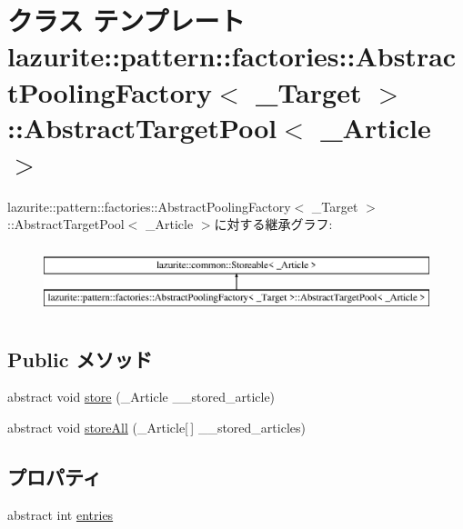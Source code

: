 \hypertarget{classlazurite_1_1pattern_1_1factories_1_1_abstract_pooling_factory_3_01___target_01_4_1_1_abstra513b29652c04fa77de240c337e958a8d}{
\section{クラス テンプレート lazurite::pattern::factories::AbstractPoolingFactory$<$ \_\-Target $>$::AbstractTargetPool$<$ \_\-Article $>$}
\label{classlazurite_1_1pattern_1_1factories_1_1_abstract_pooling_factory_3_01___target_01_4_1_1_abstra513b29652c04fa77de240c337e958a8d}
}
lazurite::pattern::factories::AbstractPoolingFactory$<$ \_\-Target $>$::AbstractTargetPool$<$ \_\-Article $>$に対する継承グラフ:\begin{figure}[H]
\begin{center}
\leavevmode
\includegraphics[height=2cm]{classlazurite_1_1pattern_1_1factories_1_1_abstract_pooling_factory_3_01___target_01_4_1_1_abstra513b29652c04fa77de240c337e958a8d}
\end{center}
\end{figure}
\subsection*{Public メソッド}
\begin{DoxyCompactItemize}
\item 
abstract void \hyperlink{classlazurite_1_1pattern_1_1factories_1_1_abstract_pooling_factory_3_01___target_01_4_1_1_abstra513b29652c04fa77de240c337e958a8d_a2d11e4ff0f0cdb377a20750454d562b7}{store} (\_\-Article \_\-\_\-stored\_\-article)
\item 
abstract void \hyperlink{classlazurite_1_1pattern_1_1factories_1_1_abstract_pooling_factory_3_01___target_01_4_1_1_abstra513b29652c04fa77de240c337e958a8d_a7b249c9e345439ad7e583aa71225e5fd}{storeAll} (\_\-Article\mbox{[}$\,$\mbox{]} \_\-\_\-stored\_\-articles)
\end{DoxyCompactItemize}
\subsection*{プロパティ}
\begin{DoxyCompactItemize}
\item 
abstract int \hyperlink{classlazurite_1_1pattern_1_1factories_1_1_abstract_pooling_factory_3_01___target_01_4_1_1_abstra513b29652c04fa77de240c337e958a8d_aae51e859cb8f4ce8f15dd3db69046711}{entries}
\end{DoxyCompactItemize}


